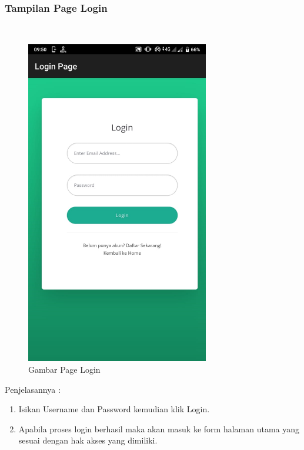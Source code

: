 \subsubsection{Tampilan Page Login}
\hfill\\
	\begin{figure}[H]
		\includegraphics[width=8cm]{figures/analisis/35.png}
		\centering
		\caption{Gambar Page Login}
	\end{figure}
Penjelasannya :
\begin{enumerate}
\item Isikan Username dan Password kemudian klik Login.
\item Apabila proses login berhasil maka akan masuk ke form halaman utama yang sesuai dengan hak akses yang dimiliki.
\end{enumerate}

